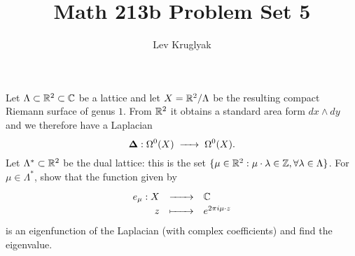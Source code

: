 \documentclass[expanded]{lkx_pset}
\title{Math 213b Problem Set 5}
\author{Lev Kruglyak}
\begin{document}
\maketitle

\begin{problem}{1}
Let $\Lambda\subset \mathbb{R}^2\subset \mathbb{C}$ be a lattice and let $X = \mathbb{R}^2/\Lambda$ be the resulting compact Riemann surface of genus $1$. From $\mathbb{R}^2$ it obtains a standard area form $dx \wedge dy$ and we therefore have a Laplacian
\[
	\bbDelta : \Omega^0(X) \longto \Omega^0(X).
\]
Let $\Lambda^*\subset \mathbb{R}^2$ be the dual lattice: this is the set $\{\mu\in \mathbb{R}^2 : \mu\cdot \lambda \in \mathbb{Z}, \forall \lambda\in \Lambda\}$. For $\mu\in \Lambda^*$, show that the function given by
\[
	\definefunction{e_\mu}{X}{\C}{z}{e^{2\pi i \mu \cdot z}}
\]
is an eigenfunction of the Laplacian (with complex coefficients) and find the eigenvalue.
\end{problem}
\end{document}
